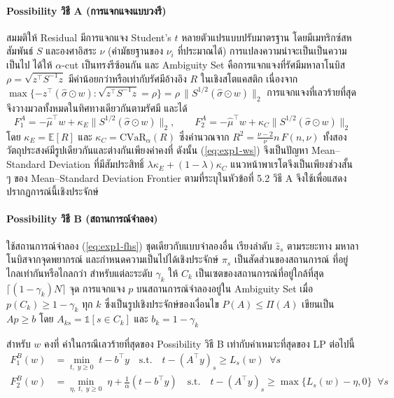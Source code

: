 \paragraph{Possibility วิธี A (การแจกแจงแบบวงรี)}
สมมติให้ Residual มีการแจกแจง Student's $t$ หลายตัวแปรแบบปรับมาตรฐาน โดยมีเมทริกซ์สหสัมพันธ์
$S$ และองศาอิสระ $\nu$ (ค่ามัธยฐานของ $\nu_i$ ที่ประมาณได้) การแปลงความน่าจะเป็นเป็นความเป็นไป
ได้ให้ $\alpha$-cut เป็นทรงรีซ้อนกัน และ Ambiguity Set คือการแจกแจงที่รัศมีมหาลาโนบิส
$\rho = \sqrt{z^\top S^{-1} z}$ มีค่าน้อยกว่าหรือเท่ากับรัศมีอ้างอิง $R$ ในเชิงสโตแคสติก เนื่องจาก
$\max\{-z^\top(\hat\sigma\odot w) : \sqrt{z^\top S^{-1}z} = \rho\} = \rho\,\lVert S^{1/2}(\hat\sigma \odot w)\rVert_2$
การแจกแจงที่เลวร้ายที่สุดจึงวางมวลทั้งหมดในทิศทางเดียวกันตามรัศมี และได้
\begin{equation}
F_1^{A} = -\hat\mu^\top w + \kappa_E \lVert S^{1/2} (\hat\sigma \odot w) \rVert_2, \qquad
F_2^{A} = -\hat\mu^\top w + \kappa_C \lVert S^{1/2} (\hat\sigma \odot w) \rVert_2
\label{eq:exp1-possA}
\end{equation}
โดย $\kappa_E = \mathbb{E}[R]$ และ $\kappa_C = \mathrm{CVaR}_\alpha(R)$ ซึ่งคำนวณจาก
$R^2 = \tfrac{\nu-2}{\nu} n \, F(n, \nu)$ ทั้งสองวัตถุประสงค์มีรูปเดียวกันและต่างกันเพียงค่าคงที่ ดังนั้น
(\ref{eq:exp1-ws}) จึงเป็นปัญหา Mean--Standard Deviation ที่มีสัมประสิทธิ์
$\lambda\kappa_E + (1-\lambda)\kappa_C$ แนวหน้าพาเรโตจึงเป็นเพียงช่วงสั้น ๆ ของ Mean--Standard
Deviation Frontier ตามที่ระบุในหัวข้อที่ 5.2 วิธี A จึงใช้เพื่อแสดงปรากฏการณ์นี้เชิงประจักษ์

\paragraph{Possibility วิธี B (สถานการณ์จำลอง)}
ใช้สถานการณ์จำลอง (\ref{eq:exp1-fhs}) ชุดเดียวกับแบบจำลองอื่น เรียงลำดับ $\hat z_s$ ตามระยะทาง
มหาลาโนบิสจากจุดพยากรณ์ และกำหนดความเป็นไปได้เชิงประจักษ์ $\pi_s$ เป็นสัดส่วนของสถานการณ์
ที่อยู่ไกลเท่ากันหรือไกลกว่า สำหรับแต่ละระดับ $\gamma_k$ ให้ $C_k$ เป็นเซตของสถานการณ์ที่อยู่ใกล้ที่สุด
$\lceil (1-\gamma_k) N \rceil$ จุด การแจกแจง $p$ บนสถานการณ์จำลองอยู่ใน Ambiguity Set เมื่อ
$p(C_k) \ge 1 - \gamma_k$ ทุก $k$ ซึ่งเป็นรูปเชิงประจักษ์ของเงื่อนไข $P(A) \le \Pi(A)$ เขียนเป็น
$A p \ge b$ โดย $A_{ks} = \mathbb{1}[s \in C_k]$ และ $b_k = 1-\gamma_k$

\begin{proposition}
\label{prop:exp1-possB}
สำหรับ $w$ คงที่ ค่าในกรณีเลวร้ายที่สุดของ Possibility วิธี B เท่ากับค่าเหมาะที่สุดของ LP ต่อไปนี้
\begin{align}
F_1^{B}(w) &= \min_{t,\; y \ge 0} \; t - b^\top y
  \quad \text{s.t.} \quad t - (A^\top y)_s \ge L_s(w) \;\; \forall s \label{eq:exp1-possB1}\\
F_2^{B}(w) &= \min_{\eta,\; t,\; y \ge 0} \; \eta + \tfrac{1}{\alpha}(t - b^\top y)
  \quad \text{s.t.} \quad t - (A^\top y)_s \ge \max\{L_s(w) - \eta, 0\} \;\; \forall s \label{eq:exp1-possB2}
\end{align}
\end{proposition}

